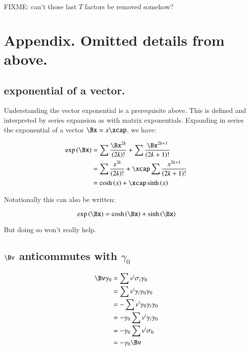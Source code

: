 FIXME: can't those last $T$ factors be removed somehow?

\section{Appendix. Omitted details from above. }

\subsection{exponential of a vector. } 

Understanding the vector exponential is a prerequisite above.  This is defined
and interpreted by series expansion as with matrix exponentials.
Expanding
in series the exponential of a vector $\Bx = x\xcap$, we have:

\begin{align*}
\exp\left(\Bx\right)
&= \sum \frac{\Bx^{2k}}{\left(2k\right)!} + \sum \frac{\Bx^{2k+1}}{\left(2k+1\right)!} \\
&= \sum \frac{x^{2k}}{\left(2k\right)!} + \xcap \sum \frac{x^{2k+1}}{\left(2k+1\right)!} \\
&= \cosh\left(x\right) + \xcap \sinh\left(x\right)
\end{align*}

Notationally this can also be written:

\begin{equation*}
\exp\left(\Bx\right) = \cosh\left(\Bx\right) + \sinh\left(\Bx\right)
\end{equation*}

But doing so won't really help.

\subsection{$\Bv$ anticommutes with $\gamma_0$ }

\begin{align*}
\Bv \gamma_0 
&= \sum v^i \sigma_i \gamma_0 \\
&= \sum v^i \gamma_i \gamma_0 \gamma_0 \\
&= -\sum v^i \gamma_0 \gamma_i \gamma_0 \\
&= - \gamma_0 \sum v^i \gamma_i \gamma_0 \\
&= - \gamma_0 \sum v^i \sigma_0 \\
&= - \gamma_0 \Bv
\end{align*}
